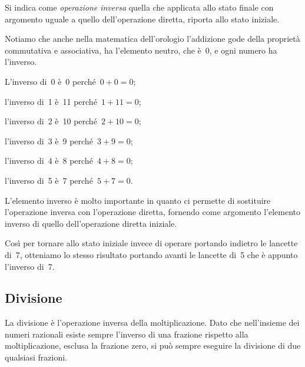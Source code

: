 Si indica come \emph{operazione inversa} quella che applicata allo stato finale con argomento
uguale a quello dell'operazione diretta, riporta allo stato iniziale.

Notiamo che anche nella matematica dell'orologio l'addizione gode della proprietà commutativa
e associativa, ha l'elemento neutro, che è~0, e ogni numero ha l'inverso.
\begin{center}
 
\end{center}

\begin{multicols}{2}
\begin{itemize*}
\item L'inverso di~0 è~0 perché~$0+0=0$;
\item l'inverso di~1 è~11 perché~$1+11=0$;
\item l'inverso di~2 è~10 perché~$2+10=0$;
\item l'inverso di~3 è~9 perché~$3+9=0$;
\item l'inverso di~4 è~8 perché~$4+8=0$;
\item l'inverso di~5 è~7 perché~$5+7=0$.
\end{itemize*}
\end{multicols}

L'elemento inverso è molto importante in quanto ci permette di sostituire l'operazione inversa
con l'operazione diretta, fornendo come argomento l'elemento inverso di quello dell'operazione diretta iniziale.
\begin{center}
 
\end{center}

Così per tornare allo stato iniziale invece di operare portando indietro le lancette di~7,
otteniamo lo stesso risultato portando avanti le lancette di~5 che è appunto l'inverso di~7.

\subsection{Divisione}

La divisione è l'operazione inversa della moltiplicazione.
Dato che nell'insieme dei numeri razionali esiste sempre l'inverso di una frazione rispetto
alla moltiplicazione, esclusa la frazione zero, si può sempre eseguire la divisione di due qualsiasi frazioni.

\begin{center}
 
\end{center}

